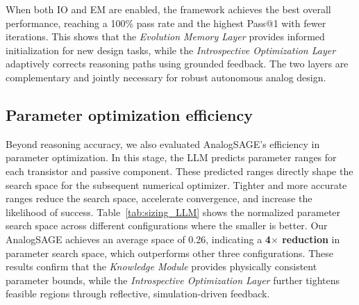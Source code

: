 When both IO and EM are enabled, the framework achieves the best overall performance, reaching a 100\% pass rate and the highest Pass@1 with fewer iterations. This shows that the \emph{Evolution Memory Layer} provides informed initialization for new design tasks, while the \emph{Introspective Optimization Layer} adaptively corrects reasoning paths using grounded feedback. The two layers are complementary and jointly necessary for robust autonomous analog design.


\subsection{Parameter optimization efficiency}



Beyond reasoning accuracy, we also evaluated AnalogSAGE’s efficiency in parameter optimization. In this stage, the LLM predicts parameter ranges for each transistor and passive component. These predicted ranges directly shape the search space for the subsequent numerical optimizer. Tighter and more accurate ranges reduce the search space, accelerate convergence, and increase the likelihood of success.
Table~\ref{tab:sizing_LLM} shows the normalized parameter search space across different configurations where the smaller is better.  
Our AnalogSAGE achieves an average space of 0.26, indicating a \textbf{4$\times$ reduction} in parameter search space, which outperforms other three configurations.  
These results confirm that the \emph{Knowledge Module} provides physically consistent parameter bounds, while the \emph{Introspective Optimization Layer} further tightens feasible regions through reflective, simulation-driven feedback.
